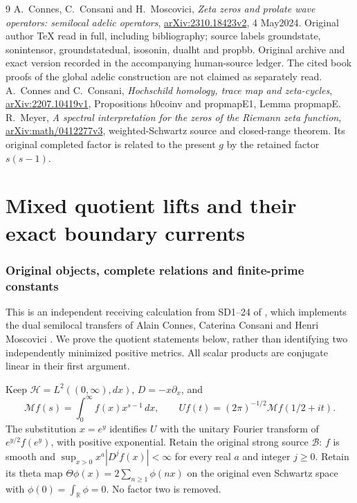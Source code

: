 \documentclass[11pt]{article}
\begin{document}
\begin{thebibliography}{9}
 A.~Connes, C.~Consani and H.~Moscovici,
\emph{Zeta zeros and prolate wave operators: semilocal adelic operators},
\href{https://arxiv.org/abs/2310.18423v2}{arXiv:2310.18423v2},
4 May2024. Original author TeX read in full, including bibliography;
source labels groundstate, sonintensor, groundstatedual, isosonin,
dualht and propbb. Original archive and exact version recorded in
the accompanying human-source ledger. The cited book proofs of
the global adelic construction are not claimed as separately read.
 A.~Connes and C.~Consani,
\emph{Hochschild homology, trace map and zeta-cycles},
\href{https://arxiv.org/abs/2207.10419v1}{arXiv:2207.10419v1},
Propositions h0coinv and propmapE1, Lemma propmapE.
 R.~Meyer,
\emph{A spectral interpretation for the zeros of the Riemann zeta function},
\href{https://arxiv.org/abs/math/0412277v3}{arXiv:math/0412277v3},
weighted-Schwartz source and closed-range theorem. Its original
completed factor is related to the present $g$ by the retained
factor $s(s-1)$.
\end{thebibliography}

\endgroup

\clearpage\begingroup
\part*{Mixed quotient lifts and their exact boundary currents}
\newcommand{\swmixC}{\mathbb C}
\newcommand{\swmixHH}{\mathcal H}
\newcommand{\swmixDD}{\mathcal D}
\newcommand{\swmixTT}{\mathsf T}
\newcommand{\swmixEE}{\mathsf E}
\newcommand{\swmixim}{\operatorname{im}}
\newcommand{\swmixM}{\mathcal M}
\newcommand{\swmixB}{\mathscr B}


\section{Original objects, complete relations and finite-prime constants}
This is an independent receiving calculation from SD1--24 of
\cite{swmix:SD}, which implements the dual semilocal transfers of Alain
Connes, Caterina Consani and Henri Moscovici \cite{swmix:CCM}. We prove the
quotient statements below, rather than identifying two independently
minimized positive metrics. All scalar products are conjugate linear
in their first argument.

Keep $\swmixHH=L^2((0,\infty),dx)$, $D=-x\partial_x$, and
\[
 \swmixM f(s)=\int_0^\infty f(x)x^{s-1}\,dx,
 \qquad Uf(t)=(2\pi)^{-1/2}\swmixM f(1/2+it).                 \tag{MQ1}
\]
The substitution $x=e^y$ identifies $U$ with the unitary Fourier
transform of $e^{y/2}f(e^y)$, with positive exponential. Retain the
original strong source $\swmixB$: $f$ is smooth and
$\sup_{x>0}x^a|D^jf(x)|<\infty$ for every real $a$ and integer
$j\ge0$. Retain its theta map
$\Theta\phi(x)=2\sum_{n\ge1}\phi(nx)$ on the original even Schwartz
space with $\phi(0)=\int_{\mathbb R}\phi=0$. No factor two is removed.
\end{document}
